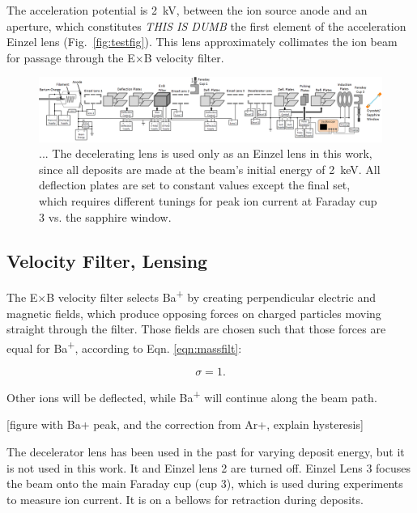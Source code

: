 The acceleration potential is 2~kV, between the ion source anode and an aperture, which constitutes \emph{THIS IS DUMB} the first element of the acceleration Einzel lens (Fig.~\ref{fig:testfig}).  This lens approximately collimates the ion beam for passage through the E$\times$B velocity filter.

\begin{figure}[H]
        \centering
                \includegraphics[width=1.\textwidth]{figures/ionBeam.png}
                \caption{ ... The decelerating lens is used only as an Einzel lens in this work, since all deposits are made at the beam's initial energy of 2~keV.  All deflection plates are set to constant values except the final set, which requires different tunings for peak ion current at Faraday cup 3 vs. the sapphire window.}
\label{fig:ionbeam}
\end{figure}

\subsection{Velocity Filter, Lensing}

The E$\times$B velocity filter selects Ba\textsuperscript{+} by creating perpendicular electric and magnetic fields, which produce opposing forces on charged particles moving straight through the filter.  Those fields are chosen such that those forces are equal for Ba\textsuperscript{+}, according to Eqn. \ref{eqn:massfilt}:

\begin{equation}
\sigma = 1.
\label{eqn:massfilt}
\end{equation}

\noindent
Other ions will be deflected, while Ba\textsuperscript{+} will continue along the beam path.

[figure with Ba+ peak, and the correction from Ar+, explain hysteresis]

The decelerator lens has been used in the past for varying deposit energy, but it is not used in this work.  It and Einzel lens 2 are turned off.  Einzel Lens 3 focuses the beam onto the main Faraday cup (cup 3), which is used during experiments to measure ion current.  It is on a bellows for retraction during deposits.

